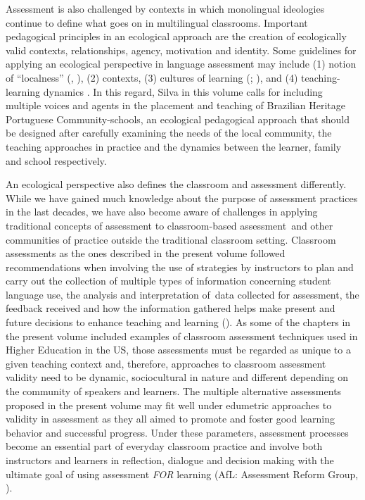 \documentclass[output=paper]{langscibook}
\begin{document}
Assessment is also challenged by contexts in which monolingual ideologies continue to define what goes on in multilingual classrooms. Important pedagogical principles in an ecological approach are the creation of ecologically valid contexts, relationships, agency, motivation and identity. Some guidelines for applying an ecological perspective in language assessment may include (1) notion of “localness” (\citealt{Freeman2000}, \citealt{Tudor2003}), (2) contexts, (3) cultures of learning (\citealt{Tudor2003}; \citealt{CortazziJin1996}), and (4) teaching-learning dynamics \citep{Tudor2001}. In this regard, Silva in this volume calls for including multiple voices and agents in the placement and teaching of Brazilian Heritage Portuguese Community-schools, an ecological pedagogical approach that should be designed after carefully examining the needs of the local community, the teaching approaches in practice and the dynamics between the learner, family and school respectively.

An ecological perspective also defines the classroom and assessment differently. While we have gained much knowledge about the purpose of assessment practices in the last decades, we have also become aware of challenges in applying traditional concepts of assessment to classroom-based assessment~and other communities of practice outside the traditional classroom setting. Classroom assessments as the ones described in the present volume followed  recommendations when involving the use of strategies by instructors to plan and carry out the collection of multiple types of information concerning student language use, the analysis and interpretation of~data collected for assessment, the feedback received and how the information gathered helps make present and future decisions to enhance teaching and learning (\citeyear[65]{Turner2012}). As some of the chapters in the present volume included examples of classroom assessment techniques used in Higher Education in the US, those assessments must be regarded as unique to a given teaching context and, therefore, approaches to classroom assessment validity need to be dynamic, sociocultural in nature and different depending on the community of speakers and learners.  The multiple alternative assessments proposed in the present volume may fit well under edumetric approaches to validity in assessment as they all aimed to promote and foster good learning behavior and successful progress. Under these parameters, assessment processes become an essential part of everyday classroom practice and involve both instructors and learners in reflection, dialogue and decision making with the ultimate goal of using assessment \textit{FOR} learning (AfL: Assessment Reform Group, \citealt{BroadfootStobart2002,LeungRea-Dickins2007}).
\end{document}
